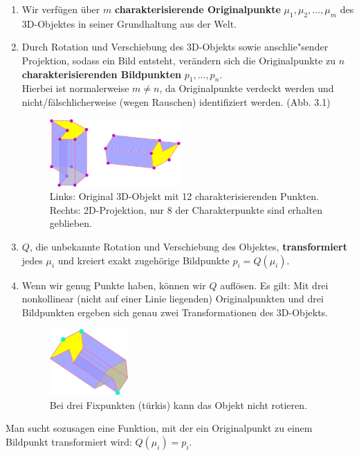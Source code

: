 \begin{enumerate}
\item Wir verfügen über $m$ \textbf{charakterisierende Originalpunkte} \mbox{$\mu_1,\mu_2,...,\mu_m$} des 3D-Objektes in seiner Grundhaltung aus der Welt.
\item Durch Rotation und Verschiebung des 3D-Objekts sowie anschlie"sender Projektion, sodass ein Bild entsteht, verändern sich die Originalpunkte zu $n$ \textbf{charakterisierenden Bildpunkten} $p_1,...,p_n$. \\
Hierbei ist normalerweise $m\neq n$, da Originalpunkte verdeckt werden und nicht/fälschlicherweise (wegen Rauschen) identifiziert werden. (Abb. 3.1)
\begin{figure}[h]
\centering
\includegraphics[width=5cm]{chapters/computervision/grafik_14_3d2d.jpg}
\caption{Links: Original 3D-Objekt mit 12 charakterisierenden Punkten. Rechts: 2D-Projektion, nur 8 der Charakterpunkte sind erhalten geblieben.}
\label{fig:14}
\end{figure}

\item $Q$, die unbekannte Rotation und Verschiebung des Objektes, \textbf{transformiert} jedes $\mu_i$ und kreiert exakt zugehörige Bildpunkte $p_i=Q(\mu_i)$.
\item Wenn wir genug Punkte haben, können wir $Q$ auflösen. Es gilt: Mit drei nonkollinear (nicht auf einer Linie liegenden) Originalpunkten und drei Bildpunkten ergeben sich genau zwei Transformationen des 3D-Objekts.
\begin{figure}[h]
\centering
\includegraphics[width=3cm]{chapters/computervision/grafik_13_fixpunkte.jpg}
\caption{Bei drei Fixpunkten (türkis) kann das Objekt nicht rotieren.}
\label{fig:13}
\end{figure}
\end{enumerate}
Man sucht sozusagen eine Funktion, mit der ein Originalpunkt zu einem Bildpunkt transformiert wird: $Q(\mu_i)=p_i$.


